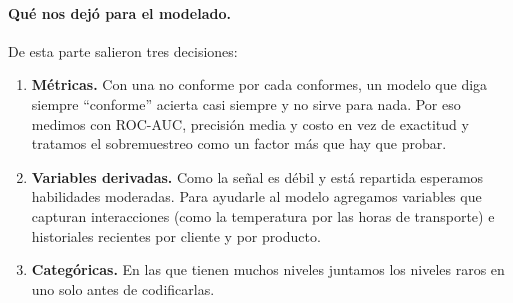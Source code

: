 \paragraph{Qué nos dejó para el modelado.} De esta parte salieron tres
decisiones:

\begin{enumerate}[label=\alph*.]
    \item \textbf{Métricas.} Con una no conforme por cada
          \ExpConformesPorNoConforme{} conformes, un modelo que diga siempre
          ``conforme'' acierta casi siempre y no sirve para nada. Por eso
          medimos con ROC-AUC, precisión media y costo en vez de exactitud y
          tratamos el sobremuestreo como un factor más que hay que probar.
    \item \textbf{Variables derivadas.} Como la señal es débil y está
          repartida esperamos habilidades moderadas. Para ayudarle al modelo
          agregamos variables que capturan interacciones (como la temperatura
          por las horas de transporte) e historiales recientes por cliente y
          por producto.
    \item \textbf{Categóricas.} En las que tienen muchos niveles juntamos los
          niveles raros en uno solo antes de codificarlas.
\end{enumerate}
